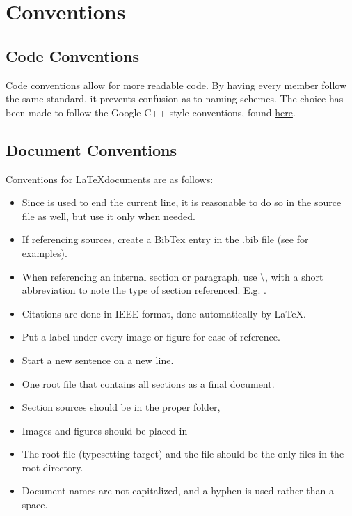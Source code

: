 \section{Conventions}
\subsection{Code Conventions}
\label{app::codecon}
Code conventions allow for more readable code.
By having every member follow the same standard, it prevents confusion as to naming schemes.
The choice has been made to follow the Google C++ style conventions, found \href{https://google.github.io/styleguide/cppguide.html}{here}.

\subsection{Document Conventions}
Conventions for \LaTeX documents are as follows:
\begin{itemize}
\item Since \code{\textbackslash\textbackslash} is used to end the current line, it is reasonable to do so in the source file as well, but use it only when needed.
\item If referencing sources, create a BibTex entry in the .bib file (see \href{https://en.wikibooks.org/wiki/LaTeX/Bibliography_Management#A_few_additional_examples}{for examples}).
\item When referencing an internal section or paragraph, use \textbackslash {}, with a short abbreviation to note the type of section referenced. E.g. .
\item Citations are done in IEEE format, done automatically by \LaTeX.
\item Put a label under every image or figure for ease of reference.
\item Start a new sentence on a new line.
\item One root file that contains all sections as a final document.
\item Section sources should be in the proper folder, 
\item Images and figures should be placed in 
\item The root file (typesetting target) and the  file should be the only files in the root directory.
\item Document names are not capitalized, and a hyphen is used rather than a space.
\end{itemize}

